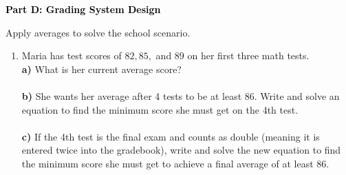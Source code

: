 \documentclass[12pt, letterpaper, fleqn]{article}
\newcommand{\blanklong}{\underline{\hspace{6.5cm}}}
\begin{document}
\newpage

\begin{tcolorbox}[colback=black!10]
    \large\textcolor{black}{\textbf{Part D: Grading System Design}}
\end{tcolorbox}

\vspace{3mm}

\noindent
Apply averages to solve the school scenario.

\vspace{5mm}

\begin{enumerate}[itemsep=2.5cm, leftmargin=0.6cm]
\item Maria has test scores of $82, 85,$ and $89$ on her first three math tests. \\
\textbf{a)} What is her current average score? \\
\blanklong \\
\textbf{b)} She wants her average after 4 tests to be at least $86$. Write and solve an equation to find the minimum score she must get on the 4th test. \\
\blanklong \\
\textbf{c)} If the 4th test is the final exam and counts as double (meaning it is entered twice into the gradebook), write and solve the new equation to find the minimum score she must get to achieve a final average of at least $86$. \\
\blanklong
\end{enumerate}
\end{document}
